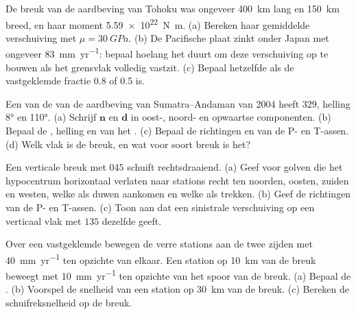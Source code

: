 \begin{exercise}[$\star\star$]\label{exo:b1:earthquake-source:6}
De breuk van de aardbeving van Tohoku was ongeveer \qty{400}{km} lang en \qty{150}{km} breed, en haar moment \qty{5.59e22}{N.m}. (a) Bereken haar gemiddelde verschuiving met $\mu = \qty{30}{GPa}$. (b) De Pacifische plaat zinkt onder Japan met ongeveer \qty{83}{mm.yr^{-1}}: bepaal hoelang het duurt om deze verschuiving op te bouwen als het grensvlak volledig vastzit. (c) Bepaal hetzelfde als de vastgeklemde fractie 0.8 of 0.5 is.
\end{exercise}

\begin{exercise}[$\star\star$]\label{exo:b1:earthquake-source:7}
Een van de  van de aardbeving van Sumatra--Andaman van 2004 heeft  $329$, helling \ang{8} en  \ang{110}. (a) Schrijf $\mathbf n$ en $\mathbf d$ in oost-, noord- en opwaartse componenten. (b) Bepaal de , helling en  van het . (c) Bepaal de richtingen en  van de P- en T-assen. (d) Welk vlak is de breuk, en wat voor soort breuk is het?
\end{exercise}

\begin{exercise}[$\star\star$]\label{exo:b1:earthquake-source:8}
Een verticale breuk met  $045$ schuift rechtsdraaiend. (a) Geef voor golven die het hypocentrum horizontaal verlaten naar stations recht ten noorden, oosten, zuiden en westen, welke als duwen aankomen en welke als trekken. (b) Geef de richtingen van de P- en T-assen. (c) Toon aan dat een sinistrale verschuiving op een verticaal vlak met  $135$ dezelfde  geeft.
\end{exercise}

\begin{exercise}[$\star\star$]\label{exo:b1:earthquake-source:9}
Over een vastgeklemde  bewegen de verre stations aan de twee zijden met \qty{40}{mm.yr^{-1}} ten opzichte van elkaar. Een station op \qty{10}{km} van de breuk beweegt met \qty{10}{mm.yr^{-1}} ten opzichte van het spoor van de breuk. (a) Bepaal de . (b) Voorspel de snelheid van een station op \qty{30}{km} van de breuk. (c) Bereken de schuifreksnelheid op de breuk.
\end{exercise}

